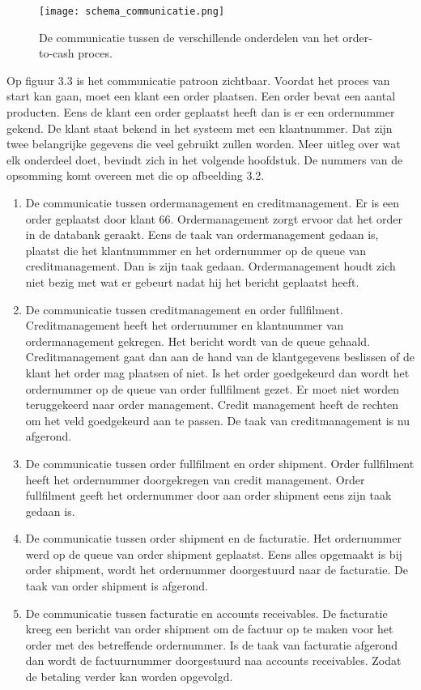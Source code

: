 \begin{figure}[h]
	\texttt{[image: schema\_communicatie.png]}
	\caption{De communicatie tussen de verschillende onderdelen van het order-to-cash proces.}
	\centering
\end{figure}
Op figuur 3.3 is het communicatie patroon zichtbaar.
Voordat het proces van start kan gaan, moet een klant een order plaatsen. Een order bevat een aantal producten. Eens de klant een order geplaatst heeft dan is er een ordernummer gekend. De klant staat bekend in het systeem met een klantnummer. Dat zijn twee belangrijke gegevens die veel gebruikt zullen worden.
Meer uitleg over wat elk onderdeel doet, bevindt zich in het volgende hoofdstuk.
De nummers van de opsomming komt overeen met die op afbeelding 3.2.
\begin{enumerate}
	\item De communicatie tussen ordermanagement en creditmanagement. Er is een order geplaatst door klant 66. Ordermanagement zorgt ervoor dat het order in de databank geraakt. Eens de taak van ordermanagement gedaan is, plaatst die het klantnummmer en het ordernummer op de queue van creditmanagement. Dan is zijn taak gedaan. Ordermanagement houdt zich niet bezig met wat er gebeurt nadat hij het bericht geplaatst heeft.
	\item De communicatie tussen creditmanagement en order fullfilment. Creditmanagement heeft het ordernummer en klantnummer van ordermanagement gekregen. Het bericht wordt van de queue gehaald. Creditmanagement gaat dan aan de hand van de klantgegevens beslissen of de klant het order mag plaatsen of niet. Is het order goedgekeurd dan wordt het ordernummer op de queue van order fullfilment gezet. Er moet niet worden teruggekeerd naar order management. Credit management heeft de rechten om het veld goedgekeurd aan te passen. De taak van creditmanagement is nu afgerond.
	\item De communicatie tussen order fullfilment en order shipment. Order fullfilment heeft het ordernummer doorgekregen van credit management. Order fullfilment geeft het ordernummer door aan order shipment eens zijn taak gedaan is. 
	\item De communicatie tussen order shipment en de facturatie. Het ordernummer werd op de queue van order shipment geplaatst. Eens alles opgemaakt is bij order shipment, wordt het ordernummer doorgestuurd naar de facturatie. De taak van order shipment is afgerond.
	\item De communicatie tussen facturatie en accounts receivables. De facturatie kreeg een bericht van order shipment om de factuur op te maken voor het order met des betreffende ordernummer. Is de taak van facturatie afgerond dan wordt de factuurnummer doorgestuurd naa accounts receivables. Zodat de betaling verder kan worden opgevolgd.

\end{enumerate}
